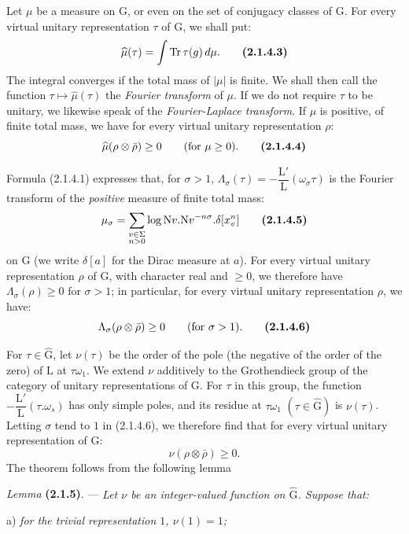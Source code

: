 \documentclass[11pt,leqno]{article}
\begin{document}
Let \(\mu\) be a measure on \(\mathrm{G}\), or even on the set of conjugacy classes of \(\mathrm{G}\). For every virtual unitary representation \(\tau\) of \(\mathrm{G}\), we shall put:
\[
\widehat{\mu}(\tau)=\int\operatorname{Tr}\tau(g)\,d\mu.
\tag*{\textbf{(2.1.4.3)}}
\]
The integral converges if the total mass of \(|\mu|\) is finite. We shall then call the function \(\tau\mapsto\widehat{\mu}(\tau)\) the \textit{Fourier transform} of \(\mu\). If we do not require \(\tau\) to be unitary, we likewise speak of the \textit{Fourier-Laplace transform}. If \(\mu\) is positive, of finite total mass, we have for every virtual unitary representation \(\rho\):
\[
\widehat{\mu}(\rho\otimes\bar{\rho})\geq0
\qquad(\text{for }\mu\geq0).
\tag*{\textbf{(2.1.4.4)}}
\]

Formula (2.1.4.1) expresses that, for \(\sigma>1\), \(\Lambda_\sigma(\tau)=-\dfrac{\mathrm{L}'}{\mathrm{L}}(\omega_\sigma\tau)\) is the Fourier transform of the \textit{positive} measure of finite total mass:
\[
\mu_\sigma
 =\sum_{\substack{v\in\Sigma\\ n>0}}
   \log\mathrm{N}v.\mathrm{N}v^{-n\sigma}.\delta[x_v^n]
\tag*{\textbf{(2.1.4.5)}}
\]
on \(\mathrm{G}\) (we write \(\delta[a]\) for the Dirac measure at \(a\)). For every virtual unitary representation \(\rho\) of \(\mathrm{G}\), with character real and \(\geq0\), we therefore have \(\Lambda_\sigma(\rho)\geq0\) for \(\sigma>1\); in particular, for every virtual unitary representation \(\rho\), we have:
\[
\Lambda_\sigma(\rho\otimes\bar{\rho})\geq0
\qquad(\text{for }\sigma>1).
\tag*{\textbf{(2.1.4.6)}}
\]

For \(\tau\in\widehat{\mathrm{G}}\), let \(\nu(\tau)\) be the order of the pole (the negative of the order of the zero) of \(\mathrm{L}\) at \(\tau\omega_1\). We extend \(\nu\) additively to the Grothendieck group of the category of unitary representations of \(\mathrm{G}\). For \(\tau\) in this group, the function \(-\dfrac{\mathrm{L}'}{\mathrm{L}}(\tau.\omega_s)\) has only simple poles, and its residue at \(\tau\omega_1\) \((\tau\in\widehat{\mathrm{G}})\) is \(\nu(\tau)\). Letting \(\sigma\) tend to \(1\) in (2.1.4.6), we therefore find that for every virtual unitary representation of \(\mathrm{G}\):
\[
\nu(\rho\otimes\bar{\rho})\geq0.
\]
The theorem follows from the following lemma

\textit{Lemma} \textbf{(2.1.5)}. — \textit{Let \(\nu\) be an integer-valued function on \(\widehat{\mathrm{G}}\). Suppose that:}

\noindent a) \textit{for the trivial representation \(1\), \(\nu(1)=1\);}
\end{document}
